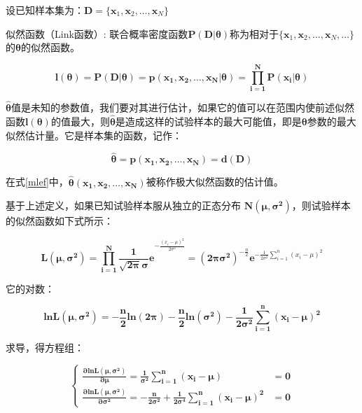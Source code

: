 \documentclass[a4paper,AutoFakeBold,oneside,12pt]{book}
\begin{document}
	设已知样本集为：$\bm{D}=\{\bm{x}_1,\bm{x}_2,\ldots,\bm{x}_N\}$

	似然函数（Link函数）: 联合概率密度函数$\bm{P(D|\theta)}$称为相对于$\{\bm{x}_1,\bm{x}_2,\ldots,\bm{x}_N,\ldots\}$的$\bm{\theta}$的似然函数。

	\begin{equation}
	\bm{l(\theta)}=\bm{P(D|\theta)}=\bm{p({x}_1,{x}_2,\ldots,{x}_N|\theta)}=\bm{\prod_{i=1}^N P(x_i|\theta)}
	\end{equation}

	$\bm{\hat{\theta}}$值是未知的参数值，我们要对其进行估计，如果它的值可以在范围内使前述似然函数$\bm{l(\theta)}$的值最大，则$\bm{\hat{\theta}}$是造成这样的试验样本的最大可能值，即是$\bm{\theta}$参数的最大似然估计量。它是样本集的函数，记作：

	\begin{equation}
	\label{mlef}
	\bm{\hat{\theta}}=\bm{p({x}_1,{x}_2,\ldots,{x}_N)}=\bm{d(D)}
	\end{equation}

	在式\ref{mlef}中，$\bm{\hat{\theta}({x}_1,{x}_2,\ldots,{x}_N)}$被称作极大似然函数的估计值。

	基于上述定义，如果已知试验样本服从独立的正态分布 $\bm{N(\mu,\sigma^2)}$，则试验样本的似然函数如下式所示：

	\begin{equation}
	\bm{L(\mu,\sigma^2)}=\bm{\prod_{i=1}^N\frac{1}{\sqrt{2\pi}\sigma}e}^{-\frac{({x}_i-\mu)^2}{2\sigma^2}}=\bm{(2\pi\sigma^2)}^{-\frac{n}{2}}\bm{e}^{-\frac{1}{2\sigma^2}\sum_{i=1}^n ({x}_i-\mu)^2}
	\end{equation}

	它的对数：

	\begin{equation}
	\bm{lnL(\mu,\sigma^2)}=\bm{-\frac{n}{2}ln(2\pi)}-\bm{\frac{n}{2}ln(\sigma^2)}-\bm{\frac{1}{2\sigma^2}\sum_{i=1}^n ({x}_i-\mu)^2}
	\end{equation}

	求导，得方程组：
	
	\begin{equation}
	\begin{cases} 
	\bm{\frac{\partial lnL(\mu,\sigma^2)}{\partial \mu}}=\bm{\frac{1}{\sigma^2}\sum_{i=1}^n ({x}_i-\mu)}&=\bm{0} \\
	\bm{\frac{\partial lnL(\mu,\sigma^2)}{\partial \sigma^2}}=\bm{-\frac{n}{2\sigma^2}}+\bm{\frac{1}{2\sigma^4}\sum_{i=1}^n ({x}_i-\mu)^2}&=\bm{0}
	 \end{cases}	
	\end{equation}
\end{document}
